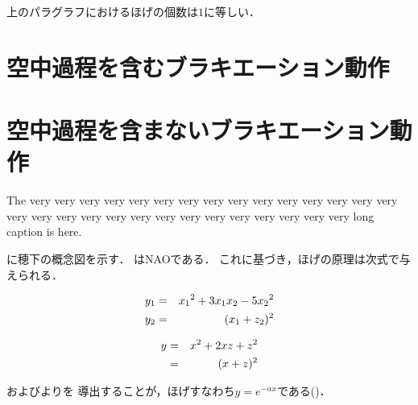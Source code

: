 \begin{small}
上のパラグラフにおけるほげの個数は$1$に等しい．


\section{空中過程を含むブラキエーション動作}
\section{空中過程を含まないブラキエーション動作}


{\baselineskip=9pt The very very very very very very very very very very very very very
very very very very very very very very very very very very very very
very very long caption is here.}

に穂下の概念図を示す．
はNAOである．
これに基づき，ほげの原理は次式で与えられる\cite{hooogeBook}．

\begin{eqnarray}
\equlabel{hoge1}
y_1 & = & {x_1}^2 + 3x_1x_2 - 5{x_2}^2 \\
\equlabel{hoge2}
y_2 & = & (x_1 + z_2)^2
\end{eqnarray}

\begin{eqnarray}
\equlabel{hoge3}
y & = & x^2 + 2xz + z^2 \nonumber\\
  & = & (x + z)^2
\end{eqnarray}


およびよりを
導出することが，ほげすなわち$y=e^{-\alpha x}$である()．








{


}

\end{small}

